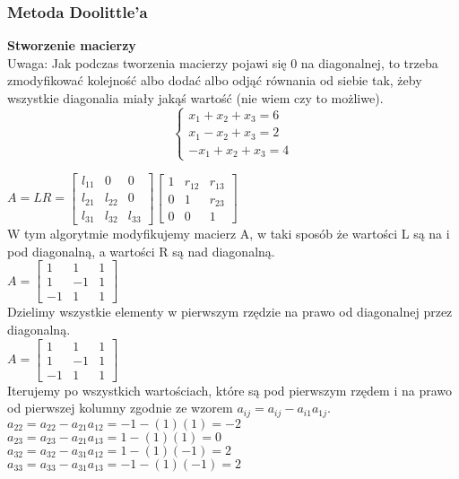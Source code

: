 \documentclass{article}
\begin{document}
\subsubsection{Metoda Doolittle'a}
\textbf{Stworzenie macierzy}\\
Uwaga: Jak podczas tworzenia macierzy pojawi się 0 na diagonalnej, to trzeba zmodyfikować kolejność albo dodać albo odjąć równania od siebie tak, żeby wszystkie diagonalia miały jakąś wartość (nie wiem czy to możliwe).\\
\begin{equation*}\begin{cases}
    x_1+x_2+x_3=6\\
    x_1-x_2+x_3=2\\
    -x_1+x_2+x_3=4
\end{cases}\end{equation*}

$A=LR=\begin{bmatrix} l_{11} & 0 & 0 \\ l_{21} & l_{22} & 0 \\ l_{31} & l_{32} & l_{33} \end{bmatrix} \begin{bmatrix} 1 & r_{12} & r_{13} \\ 0 & 1 & r_{23} \\ 0 & 0 & 1 \end{bmatrix}$\\
W tym algorytmie modyfikujemy macierz A, w taki sposób że wartości L są na i pod diagonalną, a wartości R są nad diagonalną.\\
$A=\begin{bmatrix} 1 & 1 & 1 \\ 1 & -1 & 1 \\ -1 & 1 & 1 \end{bmatrix}$\\
Dzielimy wszystkie elementy w pierwszym rzędzie na prawo od diagonalnej przez diagonalną.\\
$A=\begin{bmatrix} 1 & 1 & 1 \\ 1 & -1 & 1 \\ -1 & 1 & 1 \end{bmatrix}$\\
Iterujemy po wszystkich wartościach, które są pod pierwszym rzędem i na prawo od pierwszej kolumny zgodnie ze wzorem $a_{ij}=a_{ij}-a_{i1}a_{1j}$.\\ 
$a_{22}=a_{22}-a_{21}a_{12}=-1-(1)(1)=-2$\\
$a_{23}=a_{23}-a_{21}a_{13}=1-(1)(1)=0$\\
$a_{32}=a_{32}-a_{31}a_{12}=1-(1)(-1)=2$\\
$a_{33}=a_{33}-a_{31}a_{13}=-1-(1)(-1)=2$\\
\end{document}
